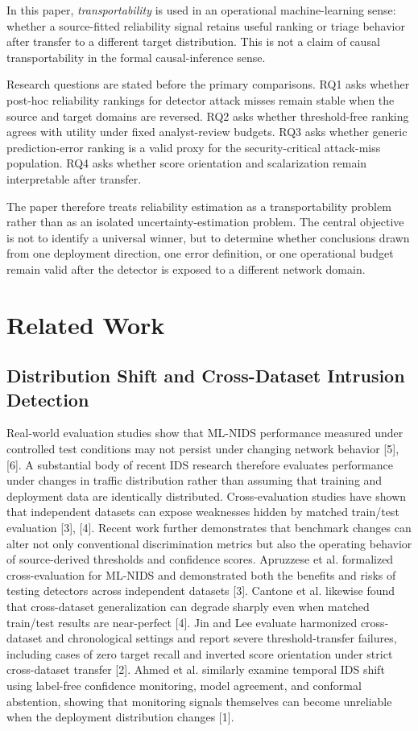 \documentclass[conference]{IEEEtran}
\begin{document}
In this paper, \emph{transportability} is used in an operational machine-learning sense: whether a source-fitted reliability signal retains useful ranking or triage behavior after transfer to a different target distribution. This is not a claim of causal transportability in the formal causal-inference sense.

Research questions are stated before the primary comparisons. RQ1 asks whether post-hoc reliability rankings for detector attack misses remain stable when the source and target domains are reversed. RQ2 asks whether threshold-free ranking agrees with utility under fixed analyst-review budgets. RQ3 asks whether generic prediction-error ranking is a valid proxy for the security-critical attack-miss population. RQ4 asks whether score orientation and scalarization remain interpretable after transfer.

The paper therefore treats reliability estimation as a transportability problem rather than as an isolated uncertainty-estimation problem. The central objective is not to identify a universal winner, but to determine whether conclusions drawn from one deployment direction, one error definition, or one operational budget remain valid after the detector is exposed to a different network domain.

\section{Related Work}

\subsection{Distribution Shift and Cross-Dataset Intrusion Detection}

Real-world evaluation studies show that ML-NIDS performance measured under controlled test conditions may not persist under changing network behavior [5], [6]. A substantial body of recent IDS research therefore evaluates performance under changes in traffic distribution rather than assuming that training and deployment data are identically distributed. Cross-evaluation studies have shown that independent datasets can expose weaknesses hidden by matched train/test evaluation [3], [4]. Recent work further demonstrates that benchmark changes can alter not only conventional discrimination metrics but also the operating behavior of source-derived thresholds and confidence scores. Apruzzese et al. formalized cross-evaluation for ML-NIDS and demonstrated both the benefits and risks of testing detectors across independent datasets [3]. Cantone et al. likewise found that cross-dataset generalization can degrade sharply even when matched train/test results are near-perfect [4]. Jin and Lee evaluate harmonized cross-dataset and chronological settings and report severe threshold-transfer failures, including cases of zero target recall and inverted score orientation under strict cross-dataset transfer [2]. Ahmed et al. similarly examine temporal IDS shift using label-free confidence monitoring, model agreement, and conformal abstention, showing that monitoring signals themselves can become unreliable when the deployment distribution changes [1].
\end{document}
